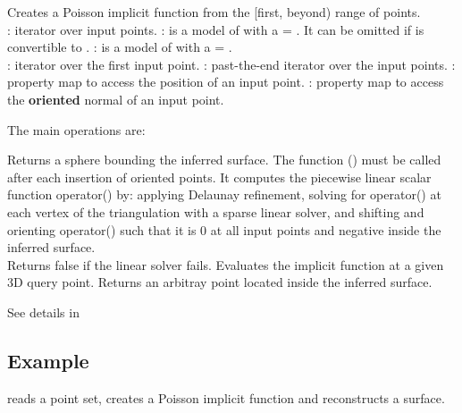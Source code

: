 {
Creates a Poisson implicit function from the [first, beyond) range of points.
  \\
: iterator over input points. : is a model of  with a  = . It can be omitted if   is convertible to . : is a model of  with a  = .
  \\
: iterator over the first input point. : past-the-end iterator over the input points. : property map to access the position of an input point. : property map to access the {\bf oriented} normal of an input point.
}

The main operations are:

{
Returns a sphere bounding the inferred surface.
}
\ccGlue
{}
{
The function () must be called after each insertion of oriented points. It computes the piecewise linear scalar function operator() by: applying Delaunay refinement, solving for operator() at each vertex of the triangulation with a sparse linear solver, and shifting and orienting operator() such that it is 0 at all input points and negative inside the inferred surface.  \\
Returns false if the linear solver fails.
}
\ccGlue
{}
{
Evaluates the implicit function at a given 3D query point.
}
\ccGlue
{}
{
Returns an arbitray point located inside the inferred surface.
}

See details in \\


\subsection{Example}

 reads a point set, creates a Poisson implicit function and reconstructs a surface.



